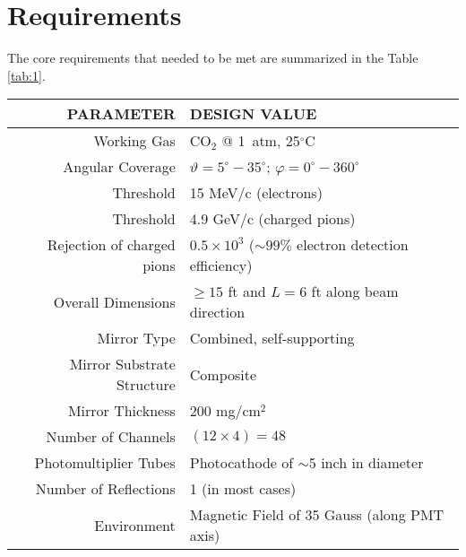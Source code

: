 \section{Requirements}

The core requirements that needed to be met are summarized in the Table \ref{tab:1}.

\begin{table*}[t]
	\centering
	\caption{Core Requirements}
	\begin{tabular}{ | r | l | }
		\hline
		PARAMETER & DESIGN VALUE \\ 
		\hline
		Working Gas & CO$_2$ @ 1~atm, 25$^\circ$C  \\ 
		\hline
		Angular Coverage & $\vartheta = 5^\circ - 35^\circ$; $\varphi = 0^\circ - 360^\circ$ \\
		\hline
		Threshold & 15 MeV/c (electrons) \\
		\hline
		Threshold & 4.9 GeV/c (charged pions) \\
		\hline
		Rejection of charged pions & $0.5 \times 10^3$  ($\sim99\%$ electron detection efficiency)  \\
		\hline
		Overall Dimensions & $\geq 15$ ft and $L = 6$ ft along beam direction  \\
		\hline
		Mirror Type & Combined, self-supporting  \\
		\hline
		Mirror Substrate Structure & Composite  \\
		\hline
		Mirror Thickness & 200 mg/cm$^2$  \\
		\hline
		Number of Channels & $(12 \times 4) = 48$  \\
		\hline
		Photomultiplier Tubes & Photocathode of $\sim$5 inch in diameter  \\
		\hline
		Number of Reflections & 1 (in most cases)   \\
		\hline
		Environment & Magnetic Field of 35 Gauss (along PMT axis)   \\
		\hline
	\end{tabular}
	\label{tab:1}
\end{table*}


